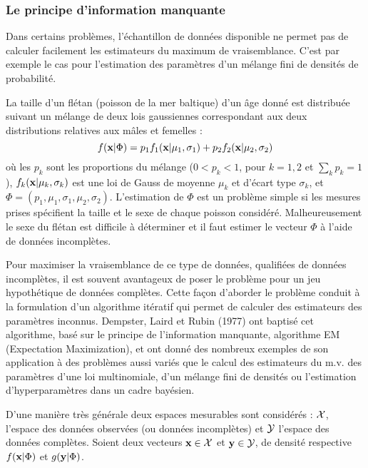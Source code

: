 \subsubsection{Le principe d'information manquante}

Dans certains probl\`emes, l'\'echantillon de donn\'ees disponible ne permet
pas de calculer facilement les estimateurs du maximum de vraisemblance. C'est 
par exemple le cas pour l'estimation des param\`etres d'un m\'elange fini
de densit\'es de probabilit\'e.

\begin{ex}
\label{ex :fletan}
\cite{Redner1984}
La taille d'un fl\'etan (poisson de la mer baltique) d'un \^age donn\'e 
est distribu\'ee suivant un m\'elange de deux lois gaussiennes correspondant
aux deux distributions relatives aux m\^ales et femelles : 
\begin{equation}
f(\mbox{\bf x} | \Phi)= p_1 f_1(\mbox{\bf x} |\mu_1,\sigma_1) + p_2 f_2(\mbox{\bf x} |\mu_2,\sigma_2)
\end{equation} 
o\`u les $p_k$ sont les proportions du m\'elange ($0<p_k<1$, pour 
$k=1,2$ et $\sum_k p_k=1$), $f_k(\mbox{\bf x} | \mu_k,\sigma_k)$ est une loi de Gauss
de moyenne $\mu_k$ et d'\'ecart type $\sigma_k$, et $\Phi=(p_1,
\mu_1,\sigma_1,\mu_2,\sigma_2 )$. L'estimation de $\Phi$ est un probl\`eme
simple si les mesures prises sp\'ecifient la taille et le sexe de chaque 
poisson consid\'er\'e. Malheureusement le sexe du fl\'etan est difficile \`a
d\'eterminer et il faut estimer le vecteur $\Phi$ \`a l'aide de donn\'ees 
incompl\`etes. 
\end{ex}

Pour maximiser la vraisemblance de ce type de donn\'ees, qualifi\'ees de 
donn\'ees incompl\`etes, il est souvent
avantageux de poser le probl\`eme pour un jeu hypoth\'etique de donn\'ees
compl\`etes. Cette fa\c con d'aborder le probl\`eme conduit \`a la formulation
d'un algorithme it\'eratif qui permet de calculer des estimateurs des
param\`etres inconnus. Dempster, Laird et Rubin (1977) ont baptis\'e cet
algorithme, bas\'e sur le principe de l'information manquante, algorithme
EM (Expectation Maximization), et ont donn\'e des nombreux exemples de 
son application \`a des probl\`emes aussi vari\'es que le calcul des 
estimateurs du m.v. des param\`etres d'une loi multinomiale,
d'un m\'elange fini de densit\'es ou l'estimation 
d'hyperparam\`etres dans un cadre bay\'esien.


D'une mani\`ere tr\`es g\'en\'erale deux espaces mesurables 
sont consid\'er\'es : $\cal{X}$, l'espace des donn\'ees observ\'ees
(ou donn\'ees incompl\`etes) et $\cal{Y}$ l'espace des donn\'ees
compl\`etes. Soient deux vecteurs $\mbox{\bf x} \in \cal{X}$ et $\mbox{\bf y} \in  \cal{Y}$,
de densit\'e respective $f(\mbox{\bf x} | \Phi)$ et $g(\mbox{\bf y} | \Phi)$.


